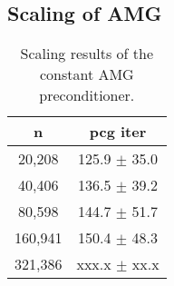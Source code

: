 \documentclass{article}
\begin{document}
\subsection{Scaling of AMG}

\begin{table}[ht]
	\caption{Scaling results of the constant AMG preconditioner.}
	\centering
	\begin{tabular}{|c|c|}
		\hline
		n & pcg iter \\
		\hline
		20,208  & 125.9 $\pm$ 35.0 \\
		40,406  & 136.5 $\pm$ 39.2  \\
		80,598  & 144.7 $\pm$ 51.7  \\
		160,941 & 150.4 $\pm$ 48.3  \\
		321,386 & xxx.x $\pm$ xx.x  \\
		\hline
	\end{tabular}
	\label{Tab:020}
\end{table}
\end{document}
